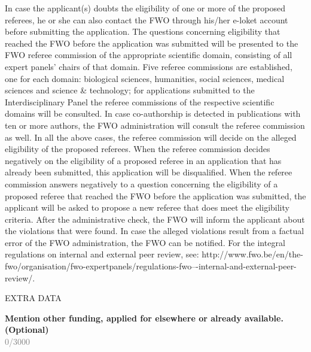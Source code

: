 \documentclass[11pt,dvipsnames,usenames,a4paper]{article}
\begin{document}
{In case the applicant(s) doubts the eligibility of one or more of the proposed referees, he or she can also contact the FWO through his/her e-loket account before submitting the application. The questions concerning eligibility that reached the FWO before the application was submitted will be presented to the FWO referee commission of the appropriate scientific domain, consisting of all expert panels’ chairs of that domain. Five referee commissions are established, one for each domain: biological sciences, humanities, social sciences, medical sciences and science \& technology; for applications submitted to the Interdisciplinary Panel the referee commissions of the respective scientific domains will be consulted. In case co-authorship is detected in publications with ten or more authors, the FWO administration will consult the referee commission as well. In all the above cases, the referee commission will decide on the alleged eligibility of the proposed referees. When the referee commission decides negatively on the eligibility of a proposed referee in an application that has already been submitted, this application will be disqualified. When the referee commission answers negatively to a question concerning the eligibility of a proposed referee that reached the FWO before the application was submitted, the applicant will be asked to propose a new referee that does meet the eligibility criteria. 
After the administrative check, the FWO will inform the applicant about the violations that were found. In case the alleged violations result from a factual error of the FWO administration, the FWO can be notified. 
For the integral regulations on internal and external peer review, see: http://www.fwo.be/en/the-fwo/organisation/fwo-expertpanels/regulations-fwo–-internal-and-external-peer-review/.}

\vspace{10pt}

\begin{shaded}\centering EXTRA DATA \end{shaded}

\textbf{Mention other funding, applied for elsewhere or already available. (Optional)}\\
\textcolor{Gray}{0/3000}\\



\end{document}

